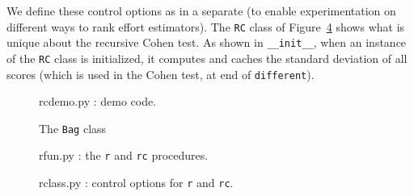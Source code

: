 \documentclass{sig-alternate}
\newcommand{\fig}[1]{Figure~\ref{fig:#1}}
\newcommand{\codeb}[2]{
  \begin{figure}[!b]
   {\scriptsize
     }
   \caption{#1}\label{fig:#2}
  \end{figure}
}
\begin{document}
We define these control options as in a separate (to
enable 
experimentation on different ways to rank effort estimators). 
The {\tt RC} class of \fig{rclass} shows what is unique
about the recursive Cohen test.
As shown in {\tt \_\_init\_\_}, 
when an instance of the {\tt RC} class is initialized, it computes and caches
the standard deviation of all scores (which is used
in the Cohen test, at end of {\tt different}). 
\codeb{rcdemo.py : demo code.}{rcdemo}
\codeb{The {\tt Bag} class}{bag}

\codeb{rfun.py : the {\tt r} and {\tt rc} procedures.}{rfun}
\codeb{rclass.py : control options for {\tt r} and {\tt rc}. }{rclass}


\end{document}
